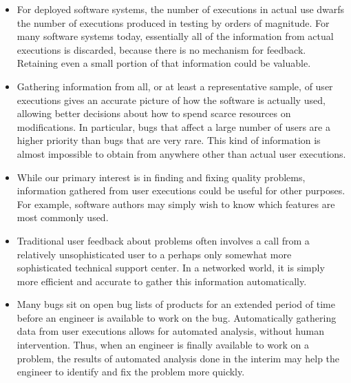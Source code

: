 \begin{itemize}
  
\item For deployed software systems, the number of executions in
  actual use dwarfs the number of executions produced in testing by
  orders of magnitude.  For many software systems today, essentially
  all of the information from actual executions is discarded, because
  there is no mechanism for feedback.  Retaining even a small portion
  of that information could be valuable.
  
\item Gathering information from all, or at least a representative
  sample, of user executions gives an accurate picture of how the
  software is actually used, allowing better decisions about how to
  spend scarce resources on modifications. In particular, bugs that
  affect a large number of users are a higher priority than bugs that
  are very rare.  This kind of information is almost impossible to
  obtain from anywhere other than actual user executions.
  
\item While our primary interest is in finding and fixing quality
  problems, information gathered from user executions could be useful
  for other purposes.  For example, software authors may simply wish
  to know which features are most commonly used.
  
\item Traditional user feedback about problems often involves a call
  from a relatively unsophisticated user to a perhaps only somewhat
  more sophisticated technical support center.  In a networked world,
  it is simply more efficient and accurate to gather this information
  automatically.
  
\item Many bugs sit on open bug lists of products for an extended
  period of time before an engineer is available to work on the bug.
  Automatically gathering data from user executions allows for
  automated analysis, without human intervention.  Thus, when an
  engineer is finally available to work on a problem, the results of
  automated analysis done in the interim may help the engineer to
  identify and fix the problem more quickly.
  

\end{itemize}

